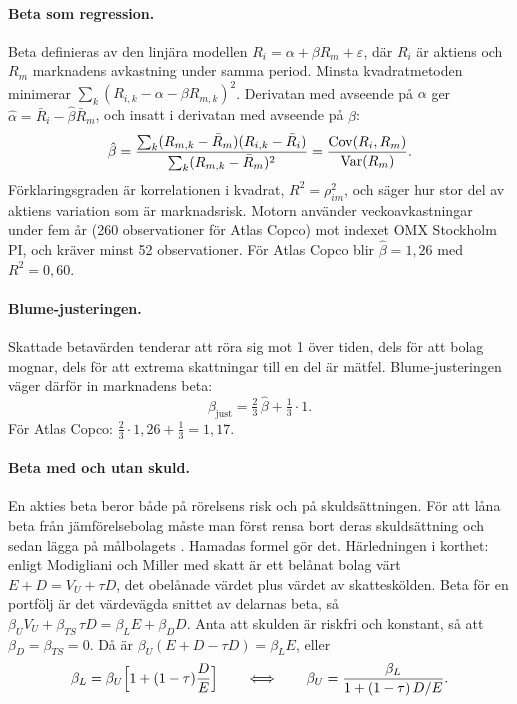 \paragraph{Beta som regression.} Beta definieras av den linjära modellen
$R_i = \alpha + \beta R_m + \varepsilon$, där $R_i$ är aktiens och $R_m$ marknadens avkastning
under samma period. Minsta kvadratmetoden  minimerar
$\sum_k (R_{i,k} - \alpha - \beta R_{m,k})^2$. Derivatan med avseende på $\alpha$ ger
$\hat\alpha = \bar R_i - \hat\beta \bar R_m$, och insatt i derivatan med avseende på $\beta$:
\begin{equation}
  \hat\beta = \frac{\sum_k (R_{m,k} - \bar R_m)(R_{i,k} - \bar R_i)}{\sum_k (R_{m,k} - \bar R_m)^2}
            = \frac{\operatorname{Cov}(R_i, R_m)}{\operatorname{Var}(R_m)} .
  \label{eq:beta}
\end{equation}
Förklaringsgraden är korrelationen i kvadrat, $R^2 = \rho_{im}^2$, och säger hur stor del av
aktiens variation som är marknadsrisk. Motorn använder veckoavkastningar under fem år (260
observationer för Atlas Copco) mot indexet OMX Stockholm PI, och kräver minst 52
observationer. För Atlas Copco blir $\hat\beta = 1,26$ med $R^2 = 0,60$.

\paragraph{Blume-justeringen.} Skattade betavärden tenderar att röra sig mot 1 över tiden, dels
för att bolag mognar, dels för att extrema skattningar till en del är mätfel. Blume-justeringen
 väger därför in marknadens beta:
\begin{equation}
  \beta_{\text{just}} = \tfrac23\, \hat\beta + \tfrac13 \cdot 1 .
  \label{eq:blume}
\end{equation}
För Atlas Copco: $\tfrac23 \cdot 1,26 + \tfrac13 = 1,17$.

\paragraph{Beta med och utan skuld.} En akties beta beror både på rörelsens risk och på
skuldsättningen. För att låna beta från jämförelsebolag måste man först rensa bort deras
skuldsättning  och sedan lägga på målbolagets . Hamadas formel gör
det. Härledningen i korthet: enligt Modigliani och Miller med skatt är ett belånat bolag värt
$E + D = V_U + \tau D$, det obelånade värdet plus värdet av skatteskölden. Beta för en
portfölj är det värdevägda snittet av delarnas beta, så
$\beta_U V_U + \beta_{TS}\,\tau D = \beta_L E + \beta_D D$. Anta att skulden är riskfri och
konstant, så att $\beta_D = \beta_{TS} = 0$. Då är $\beta_U (E + D - \tau D) = \beta_L E$, eller
\begin{equation}
  \beta_L = \beta_U \Bigl[1 + (1-\tau)\frac{D}{E}\Bigr]
  \qquad\Longleftrightarrow\qquad
  \beta_U = \frac{\beta_L}{1 + (1-\tau)\,D/E} .
  \label{eq:hamada}
\end{equation}

